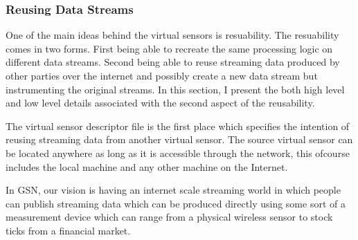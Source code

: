 \subsubsection{Reusing Data Streams}

One of the main ideas behind the virtual sensors is resuability. The resuability comes in two forms.
First being able to recreate the same processing logic on different data streams.
Second being able to reuse streaming data produced by other parties over the internet and possibly create a new data stream but instrumenting the original streams.
In this section, I present the both high level and low level details associated with the second aspect of the reusability.

The virtual sensor descriptor file is the first place which specifies the intention of reusing streaming data from another virtual sensor. The source virtual sensor can be located
anywhere as long as it is accessible through the network, this ofcourse includes the local machine and any other machine on the Internet. 


In GSN, our vision is having an internet scale streaming world in which people can publish streaming data which
can be produced directly using some sort of a measurement device which can range from a physical wireless sensor to stock ticks from a financial market.







